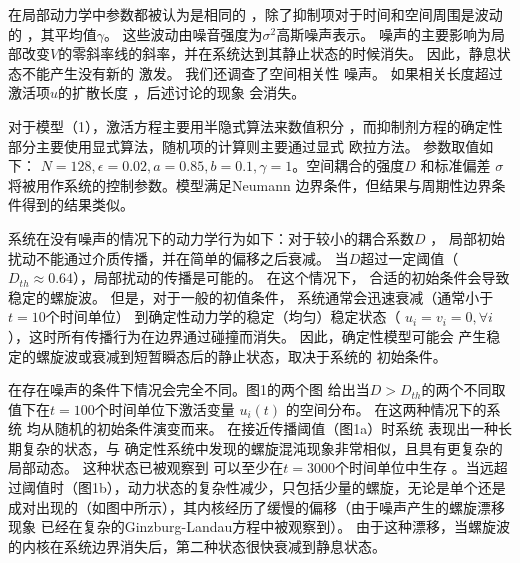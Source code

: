 \documentclass[
bachelor,
nofont, %
pdflinks,
]{xjtuthesis}
\begin{document}
\medskip
在局部动⼒学中参数都被认为是相同的
，除了抑制项对于时间和空间周围是波动的
，其平均值$\gamma$。 这些波动由噪⾳强度为$\sigma^2$⾼斯噪声表⽰。 噪声的主要影响为局部改变$V$的零斜率线的斜率，并在系统达到其静⽌状态的时候消失。 因此，静息状态不能产生没有新的
激发。 我们还调查了空间相关性
噪声。 如果相关长度超过激活项$u$的扩散长度 ，后述讨论的现象
会消失。

\medskip
对于模型（1），激活方程主要⽤半隐式算法来数值积分
，而抑制剂⽅程的确定性部分主要使用显式算法，随机项的计算则主要通过显式
欧拉⽅法。 参数取值如下： $N = 128,\epsilon = 0.02,a = 0.85,b = 0.1,\gamma = 1$。空间耦合的强度$D$ 和标准偏差
$\sigma$ 将被⽤作系统的控制参数。模型满足Neumann
边界条件，但结果与周期性边界条件得到的结果类似。

\medskip
系统在没有噪声的情况下的动力学行为如下：对于较小的耦合系数$D$ ，
局部初始扰动不能通过介质传播，并在简单的偏移之后衰减。 当$D$超过⼀定阈值（$D_{th} \approx 0.64$），局部扰动的传播是可能的。 在这个情况下，
合适的初始条件会导致稳定的螺旋波。 但是，对于⼀般的初值条件，
系统通常会迅速衰减（通常⼩于 $t = 10$个时间单位）
到确定性动⼒学的稳定（均匀）稳定状态（ $u_i = v_i = 0,\forall i$ ），这时所有传播行为在边界通过碰撞而消失。 因此，确定性模型可能会
产生稳定的螺旋波或衰减到短暂瞬态后的静⽌状态，取决于系统的
初始条件。

\medskip
在存在噪声的条件下情况会完全不同。图1的两个图
给出当$D> D_{th}$的两个不同取值下在$t = 100$个时间单位下激活变量 $u_i(t)$ 的空间分布。 在这两种情况下的系统
均从随机的初始条件演变⽽来。 在接近传播阈值（图1a）时系统
表现出⼀种长期复杂的状态，与
确定性系统中发现的螺旋混沌现象⾮常相似，且具有更复杂的局部动态。 这种状态已被观察到
可以⾄少在$ t = 3000$个时间单位中⽣存 。当远超过阈值时（图1b），动⼒状态的复杂性减少，只包括少量的螺旋，⽆论是单个还是成对出现的（如图中所⽰），其内核经历了缓慢的偏移（由于噪声产生的螺旋漂移现象
已经在复杂的Ginzburg-Landau方程中被观察到）。 由于这种漂移，当螺旋波的内核在系统边界消失后，第二种状态很快衰减到静息状态。
\end{document}
